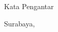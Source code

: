 \chapter*{\kataPengantar}
Kata Pengantar

 
\vspace*{0.1cm}
\begin{flushright}
Surabaya, \tanggalPengesahan\\[0.1cm]
\vspace*{1cm}
\penulis

\end{flushright}